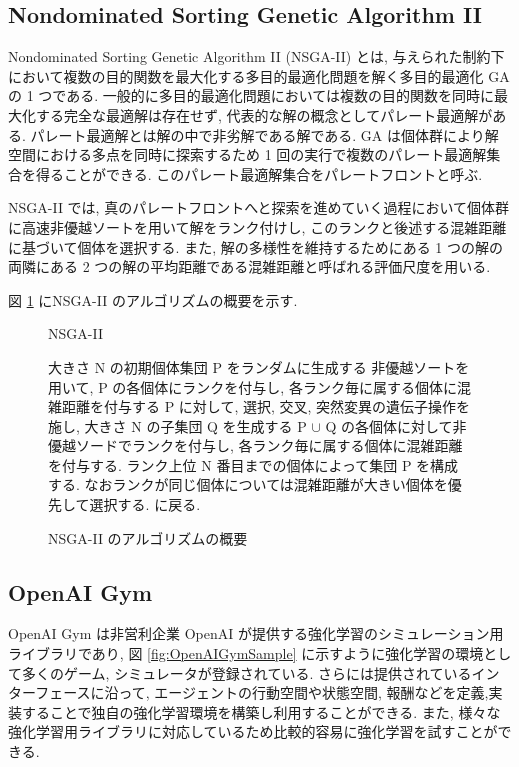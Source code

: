 \documentclass[12pt]{jarticle}
\begin{document}
\subsection{Nondominated
Sorting Genetic Algorithm II}
Nondominated
Sorting Genetic Algorithm II (NSGA-II) とは, 与えられた制約下において複数の目的関数を最大化する多目的最適化問題を解く多目的最適化 GA の 1 つである. 一般的に多目的最適化問題においては複数の目的関数を同時に最大化する完全な最適解は存在せず, 代表的な解の概念としてパレート最適解がある. パレート最適解とは解の中で非劣解である解である. GA は個体群により解空間における多点を同時に探索するため 1 回の実行で複数のパレート最適解集合を得ることができる. このパレート最適解集合をパレートフロントと呼ぶ. \par
NSGA-II では, 真のパレートフロントへと探索を進めていく過程において個体群に高速非優越ソートを用いて解をランク付けし, このランクと後述する混雑距離に基づいて個体を選択する. また, 解の多様性を維持するためにある 1 つの解の両隣にある 2 つの解の平均距離である混雑距離と呼ばれる評価尺度を用いる.
\par
図 \ref{alg:NSGA2} にNSGA-II のアルゴリズムの概要を示す.
\begin{figure}[H]
  \begin{algorithm}[H]
      \caption{
        NSGA-II
        }
      \begin{algorithmic}[1] 
        \STATE 大きさ N の初期個体集団 P をランダムに生成する
        \STATE 非優越ソートを用いて, P の各個体にランクを付与し, 各ランク毎に属する個体に混雑距離を付与する
        \STATE P に対して, 選択, 交叉, 突然変異の遺伝子操作を施し, 大きさ N の子集団 Q を生成する
        \STATE P $\cup$ Q の各個体に対して非優越ソードでランクを付与し, 各ランク毎に属する個体に混雑距離を付与する. ランク上位 N 番目までの個体によって集団 P を構成する. なおランクが同じ個体については混雑距離が大きい個体を優先して選択する.
         に戻る.
      \end{algorithmic}
  \end{algorithm}
  \caption{NSGA-II のアルゴリズムの概要 \cite{NSGA-2}}
  \label{alg:NSGA2}
  \end{figure}

  \subsection{OpenAI Gym}
  OpenAI Gym \cite{OpenAIGym} は非営利企業 OpenAI が提供する強化学習のシミュレーション用ライブラリであり, 図 \ref{fig:OpenAIGymSample} に示すように強化学習の環境として多くのゲーム, シミュレータが登録されている. さらには提供されているインターフェースに沿って, エージェントの行動空間や状態空間, 報酬などを定義,実装することで独自の強化学習環境を構築し利用することができる. また, 様々な強化学習用ライブラリに対応しているため比較的容易に強化学習を試すことができる.
  
\end{document}
